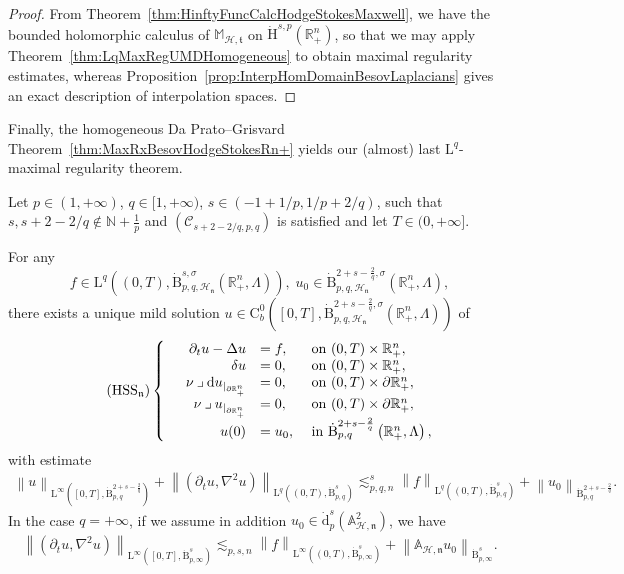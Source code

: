 \documentclass[AHL,Unicode,longabstracts,published]{cedram}
\newcommand{\bbA}{\mathbb{A}}
\newcommand{\bbR}{\mathbb{R}}
\newcommand{\bbN}{\mathbb{N}}
\newcommand{\bbM}{\mathbb{M}}
\newcommand{\rmH}{\mathrm{H}}%
\newcommand{\rmB}{\mathrm{B}}
\newcommand{\rmd}{\mathrm{d}}
\newcommand{\rmL}{\mathrm{L}}
\newcommand{\rmC}{\mathrm{C}}
\newcommand{\clH}{\mathcal{H}}
\newcommand{\clC}{\mathcal{C}}
\newcommand{\fkn}{\mathfrak{n}}
\newcommand{\fkt}{\mathfrak{t}}
\newcommand{\iprod}{\mathbin{\lrcorner}}
\begin{document}
\begin{proof}
From Theorem~\ref{thm:HinftyFuncCalcHodgeStokesMaxwell}, we have the bounded holomorphic calculus of $\bbM_\mathcal{H,\fkt}$ on $\dot{\rmH}^{s,p}(\bbR^n_+)$, so that we may apply Theorem~\ref{thm:LqMaxRegUMDHomogeneous} to obtain maximal regularity estimates, whereas Proposition~\ref{prop:InterpHomDomainBesovLaplacians} gives an exact description of interpolation spaces.
\end{proof}

Finally, the homogeneous Da Prato--Grisvard Theorem~\ref{thm:MaxRxBesovHodgeStokesRn+} yields our (almost) last $\rmL^q$-maximal regularity theorem.

\begin{theo}\label{thm:MaxRxBesovHodgeStokesRn+}
Let $p\in(1,+\infty)$, $q\in[1,+\infty)$, $s\in(-1+1/p,1/p+2/q)$, such that $s,s+2-2/q\notin \bbN +\frac{1}{p}$ and $(\clC_{s+2-2/q,p,q})$ is satisfied and let $T\in(0,+\infty]$.

For any 
\[
f\in \rmL^q\left((0,T),\dot{\rmB}^{s,\sigma}_{p,q,\mathcal{\clH_{\fkn}}}\left(\bbR^n_+,\Lambda\right)\right), \; u_0\in \dot{\rmB}^{2+s-\frac{2}{q},\sigma}_{p,q,\clH_\fkn}\left(\bbR^n_+,\Lambda\right),
\]
there exists a unique mild solution $u \in \rmC ^0_b([0,T],\dot{\rmB}^{2+s-\frac{2}{q},\sigma}_{p,q,\clH_\fkn}(\bbR^n_+,\Lambda))$ of
\begin{equation}
\tag{HSS${}_{\fkn}$}\label{eq:HodgeStokesAbsoluteBCSystem}
\left\{
\begin{array}{rrll}
&{\partial_t u - \Delta u}  &{= f,} &{\text{ on } (0,T)\times\bbR^n_+,}\\
&{\delta u} &{=  0,} &{\text{ on } (0,T)\times\bbR^n_+,}\\
&{\nu\iprod\rmd u_{|_{\partial\bbR^n_+}}} &{=  0,}
&{\text{ on } (0,T)\times\partial\bbR^n_+,}\\
&{\nu\iprod u_{|_{\partial\bbR^n_+}}} &{=  0,}
&{\text{ on } (0,T)\times\partial\bbR^n_+,}\\
&{u(0)} &{=  u_0,}
&{\text{ in } \dot{\rmB}^{2+s-\frac{2}{q}}_{p,q}\left(\bbR^n_+,\Lambda\right),}
\end{array}\right.
\end{equation}
with estimate
\begin{align*}
\left\| u \right\|_{\rmL^\infty([0,T],\dot{\rmB}^{2+s-\frac{2}{q}}_{p,q})} + 
\left\| \left(\partial_t u, \nabla^2 u\right) \right\|_{\rmL^q\left((0,T),\dot{\rmB}^{s}_{p,q}\right)} \lesssim_{p,q,n}^{s} \left\| f \right\|_{\rmL^q\left((0,T),\dot{\rmB}^{s}_{p,q}\right)} + \left\| u_0 \right\|_{\dot{\rmB}^{2+s-\frac{2}{q}}_{p,q}}.
\end{align*}
In the case $q=+\infty$, if we assume in addition $u_0\in \dot{\rmd}^{s}_{p}(\bbA_{\clH,\fkn}^2)$, we have
\begin{align*}
\left\| \left(\partial_t u, \nabla^2 u\right)\right\|_{\rmL^\infty\left([0,T],\dot{\rmB}^{s}_{p,\infty}\right)} \lesssim_{p,s,n} \left\| f \right\|_{\rmL^\infty\left((0,T),\dot{\rmB}^{s}_{p,\infty}\right)} + \left\| \bbA_{\clH,\fkn} u_0 \right\|_{\dot{\rmB}^{s}_{p,\infty}}.
\end{align*}
\end{theo}
\end{document}
